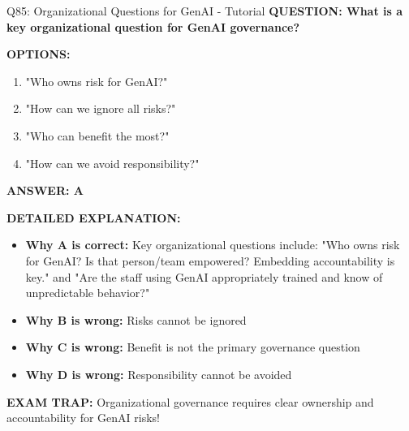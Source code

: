 \documentclass[8pt]{beamer}
\begin{document}
	\begin{frame}{Q85: Organizational Questions for GenAI - Tutorial}
		\fontsize{6.5}{7.5}\selectfont
		\textbf{QUESTION: What is a key organizational question for GenAI governance?}
		
		\vspace{0.1cm}
		\textbf{OPTIONS:}
		\begin{enumerate}
			\item "Who owns risk for GenAI?"
			\item "How can we ignore all risks?"
			\item "Who can benefit the most?"
			\item "How can we avoid responsibility?"
		\end{enumerate}
		
		\vspace{0.1cm}
		\textcolor{myblue}{\textbf{ANSWER: A}}
		
		\vspace{0.1cm}
		\textbf{DETAILED EXPLANATION:}
		\begin{itemize}
			\item \textbf{Why A is correct:} Key organizational questions include: "Who owns risk for GenAI? Is that person/team empowered? Embedding accountability is key." and "Are the staff using GenAI appropriately trained and know of unpredictable behavior?"
			\item \textbf{Why B is wrong:} Risks cannot be ignored
			\item \textbf{Why C is wrong:} Benefit is not the primary governance question
			\item \textbf{Why D is wrong:} Responsibility cannot be avoided
		\end{itemize}
		
		\textcolor{myred}{\textbf{EXAM TRAP:}} Organizational governance requires \textcolor{myblue}{clear ownership and accountability} for GenAI risks!
	\end{frame}
	
	
\end{document}
